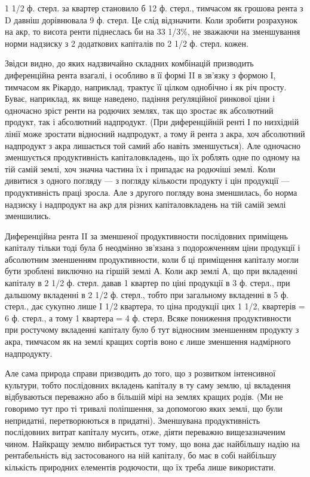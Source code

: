 \parcont{}  %
1 1/2 ф. стерл. за квартер становило б 12 ф. стерл., тимчасом як грошова рента
з D давніш дорівнювала 9 ф. стерл. Це слід відзначити. Коли зробити розрахунок
на акр, то висота ренти піднеслась би на 33 1/3\%, не зважаючи на зменшування
норми надзиску з 2 додаткових капіталів по 2 1/2 ф. стерл. кожен.

Звідси видно, до яких надзвичайно складних комбінацій призводить диференційна
рента взагалі, і особливо в її формі II в зв’язку з формою І, тимчасом
як Рікардо, наприклад, трактує її цілком однобічно і як річ просту. Буває, наприклад,
як вище наведено, падіння реґуляційної ринкової ціни і одночасно зріст
ренти на родючих землях, так що зростає як абсолютний продукт, так і
абсолютний надпродукт. (При диференційній ренті І по низхідній лінії може
зростати відносний надпродукт, а тому й рента з акра, хоч абсолютний надпродукт
з акра лишається той самий або навіть зменшується). Але одночасно
зменшується продуктивність капіталовкладень, що їх роблять одне по одному
на тій самій землі, хоч значна частина їх і припадає на родючіші землі. Коли
дивитися з одного погляду — з погляду кількости продукту і цін продукції —
продуктивність праці зросла. Але з другого погляду вона зменшилась, бо норма
надзиску і надпродукт на акр для різних капіталовкладень на тій самій землі
зменшились.

Диференційна рента II за зменшеної продуктивности послідовних приміщень
капіталу тільки тоді була б неодмінно зв’язана з подорожченням ціни продукції
і абсолютним зменшенням продуктивности, коли б ці приміщення капіталу
могли бути зроблені виключно на гіршій землі А. Коли акр землі А, що
при вкладенні капіталу в 2 1/2 ф. стерл. давав 1 квартер по ціні продукції
в 3 ф. стерл., при дальшому вкладенні в 2 1/2 ф. стерл., тобто при загальному
вкладенні в 5 ф. стерл., дає сукупно лише I 1/2 квартера, то ціна продукції цих
1 1/2, квартерів = 6 ф. стерл., а тому 1 квартера = 4 ф. стерл. Всяке пониження
продуктивности при ростучому вкладенні капіталу було б тут відносним зменшенням
продукту з акра, тимчасом як на землі кращих сортів воно є лише
зменшення надмірного надпродукту.

Але сама природа справи призводить до того, що з розвитком інтенсивної
культури, тобто послідовних вкладень капіталу в ту саму землю, ці вкладення
відбуваються переважно або в більшій мірі на землях кращих родів. (Ми не говоримо
тут про ті тривалі поліпшення, за допомогою яких землі, що були непридатні,
перетворюються в придатні). Зменшувана продуктивність послідовних
витрат капіталу мусить, отже, діяти переважно вищезазначеним чином. Найкращу
землю вибирається тут тому, що вона дає найбільшу надію на рентабельність
від застосованого на ній капіталу, бо має в собі найбільшу кількість природних
елементів родючости, що їх треба лише використати.

